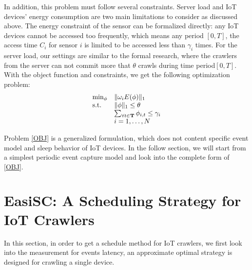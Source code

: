 \documentclass[conference]{IEEEtran}
\begin{document}
In addition, this problem must follow several constraints. Server load and IoT devices' energy consumption are two main limitations to consider as discussed above. 
The energy constraint of the sensor can be formalized directly: any IoT devices cannot be accessed too frequently, which means any period $[0, T]$, the access time $C_i$ for sensor $i$ is limited to be accessed less than $\gamma_i$ times. For the server load, our settings are similar to the formal research\cite{Wolf2002}, where the crawlers from the server can not commit more that $\theta$ crawls during time period$[0, T]$.
With the object function and constraints, we get the following optimization problem:
\begin{eqnarray}
\begin{array}{ll}
\min_{\phi}&\Arrowvert \omega_i E(\phi) \Arrowvert_{1}\\
\text{s.t.}
&\Arrowvert \phi \Arrowvert_{1}\leq\theta\\
&\sum_{\forall t \in \mathbf{T}}{\phi_{i,t}}\leq\gamma_i\\
&i=1,\ldots,N
\end{array}\label{OBJ}
\end{eqnarray}


Problem \eqref{OBJ} is a generalized formulation, which does not content specific event model and sleep behavior of IoT devices. In the follow section, we will start from a simplest periodic event capture model and look into the complete form of \eqref{OBJ}.

\section{EasiSC: A Scheduling Strategy for\\IoT Crawlers}

In this section, in order to get a schedule method for IoT crawlers, we first look into the measurement for events latency, an approximate optimal strategy is designed for crawling a single device. 
\end{document}
